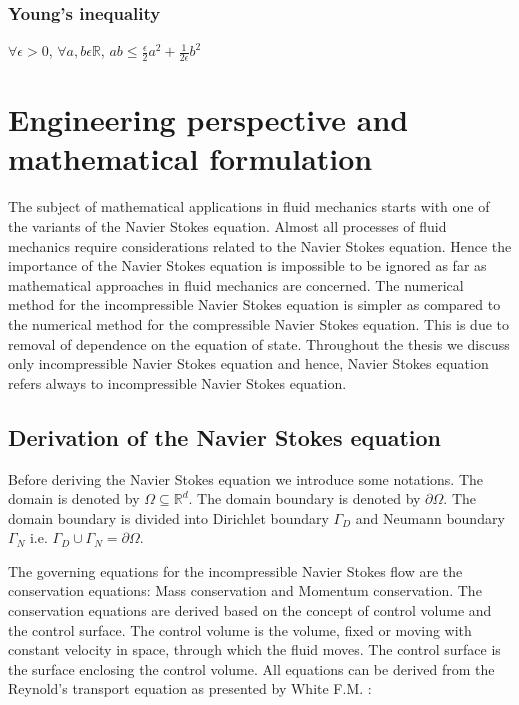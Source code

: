 \documentclass[a4paper,12pt]{book}
\begin{document}
\subsection{Young's inequality} 
\begin{center}
$\forall \epsilon > 0$, $\forall a,b \epsilon \mathbb{R}$, $ab \leq \frac{\epsilon}{2}a^2 + \frac{1}{2 \epsilon}b^2$\\
\end{center}

\chapter[Perspective and Formulation]{Engineering perspective and mathematical formulation} 

The subject of mathematical applications in fluid mechanics starts with  one of the variants of the Navier Stokes equation. Almost all processes of fluid mechanics require considerations related to the Navier Stokes equation. Hence the importance of the Navier Stokes equation is impossible to be ignored as far as mathematical approaches in fluid mechanics are concerned. The numerical method for the incompressible Navier Stokes equation is simpler as compared to the numerical method for the compressible Navier Stokes equation. This is due to removal of dependence on the equation of state. Throughout the thesis we discuss only incompressible Navier Stokes equation and hence, Navier Stokes equation refers always to incompressible Navier Stokes equation.

\section[Derivation]{Derivation of the Navier Stokes equation}

Before deriving the Navier Stokes equation we introduce some notations. The domain is denoted by $\Omega \subseteq \mathbb{R}^d $. The domain boundary is denoted by $\partial \Omega$. The domain boundary is divided into Dirichlet boundary $\Gamma_D$ and Neumann boundary $\Gamma_N$ i.e. $\Gamma_D \cup \Gamma_N = \partial \Omega $. 

The governing equations for the incompressible Navier Stokes flow are the conservation equations: Mass conservation and Momentum conservation. The conservation equations are derived based on the concept of control volume and the control surface. The control volume is the volume, fixed or moving with constant velocity in space, through which the fluid moves. The control surface is the surface enclosing the control volume. All equations can be derived from the Reynold's transport equation as presented by White F.M. \cite{white}:
\end{document}

